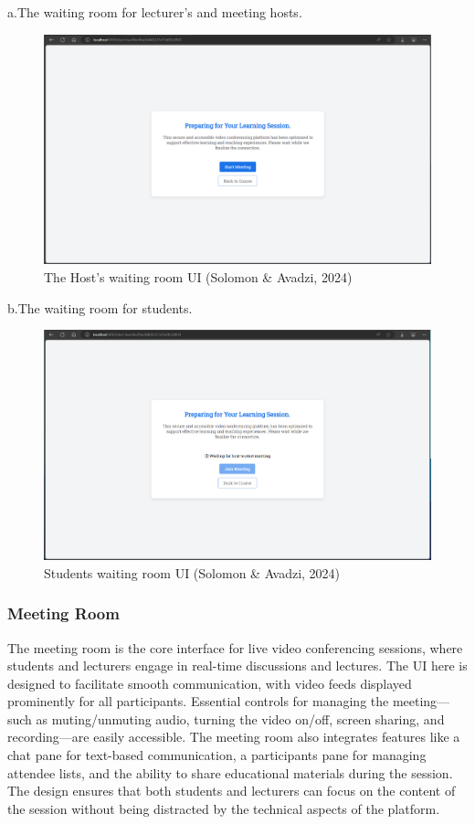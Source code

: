 \documentclass[a4paper,12pt]{article}  %
\begin{document}
a.The waiting room for lecturer’s and meeting hosts.\\

\begin{figure}[H]
      \centering
      \includegraphics[width=1\textwidth]{figures/host-waiting-room.png}
      \caption{The Host's waiting room UI (Solomon \& Avadzi, 2024)}
\end{figure}

b.The waiting room for students.\\
\begin{figure}[H]
      \centering
      \includegraphics[width=1\textwidth]{figures/waiting-studs.png}
      \caption{Students waiting room UI (Solomon \& Avadzi, 2024)}
\end{figure}

\subsubsection{Meeting Room}
The meeting room is the core interface for live video conferencing sessions, where students and lecturers engage in real-time discussions and lectures. The UI here is designed to facilitate smooth communication, with video feeds displayed prominently for all participants. Essential controls for managing the meeting—such as muting/unmuting audio, turning the video on/off, screen sharing, and recording—are easily accessible. The meeting room also integrates features like a chat pane for text-based communication, a participants pane for managing attendee lists, and the ability to share educational materials during the session. The design ensures that both students and lecturers can focus on the content of the session without being distracted by the technical aspects of the platform.\\
\end{document}
